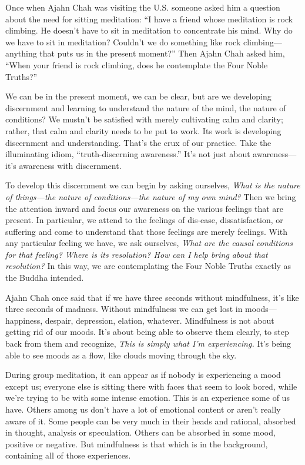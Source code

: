Once when Ajahn Chah was visiting the U.S. someone asked him a question 
about the need for sitting meditation: ``I have a friend whose 
meditation is rock climbing. He doesn't have to sit in meditation to 
concentrate his mind. Why do we have to sit in meditation? Couldn't we 
do something like rock climbing---anything that puts us in the present 
moment?'' Then Ajahn Chah asked him, ``When your friend is rock 
climbing, does he contemplate the Four Noble Truths?''

We can be in the present moment, we can be clear, but are we developing 
discernment and learning to understand the nature of the mind, the 
nature of conditions? We mustn't be satisfied with merely cultivating 
calm and clarity; rather, that calm and clarity needs to be put to 
work. Its work is developing discernment and understanding. That's the 
crux of our practice. Take the illuminating idiom, ``truth-discerning 
awareness.'' It's not just about awareness---it's awareness with 
discernment.

To develop this discernment we can begin by asking ourselves, 
\emph{What is the nature of things---the nature of conditions---the 
nature of my own mind?} Then we bring the attention inward and focus 
our awareness on the various feelings that are present. In particular, 
we attend to the feelings of dis-ease, dissatisfaction, or suffering 
and come to understand that those feelings are merely feelings. With 
any particular feeling we have, we ask ourselves, \emph{What are the 
causal conditions for that feeling? Where is its resolution? How can I 
help bring about that resolution?} In this way, we are contemplating 
the Four Noble Truths exactly as the Buddha intended.


Ajahn Chah once said that if we have three seconds without mindfulness, 
it's like three seconds of madness. Without mindfulness we can get lost 
in moods---happiness, despair, depression, elation, whatever. 
Mindfulness is not about getting rid of our moods. It's about being 
able to observe them clearly, to step back from them and recognize, 
\emph{This is simply what I'm experiencing.} It's being able to see 
moods as a flow, like clouds moving through the sky.

During group meditation, it can appear as if nobody is experiencing a 
mood except us; everyone else is sitting there with faces that seem to 
look bored, while we're trying to be with some intense emotion. This is 
an experience some of us have. Others among us don't have a lot of 
emotional content or aren't really aware of it. Some people can be very 
much in their heads and rational, absorbed in thought, analysis or 
speculation. Others can be absorbed in some mood, positive or negative. 
But mindfulness is that which is in the background, containing all of 
those experiences.

